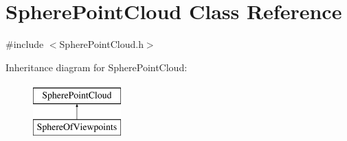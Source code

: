 \hypertarget{class_sphere_point_cloud}{\section{Sphere\+Point\+Cloud Class Reference}
\label{class_sphere_point_cloud}
}


{\ttfamily \#include $<$Sphere\+Point\+Cloud.\+h$>$}

Inheritance diagram for Sphere\+Point\+Cloud\+:\begin{figure}[H]
\begin{center}
\leavevmode
\includegraphics[height=2.000000cm]{class_sphere_point_cloud}
\end{center}
\end{figure}

